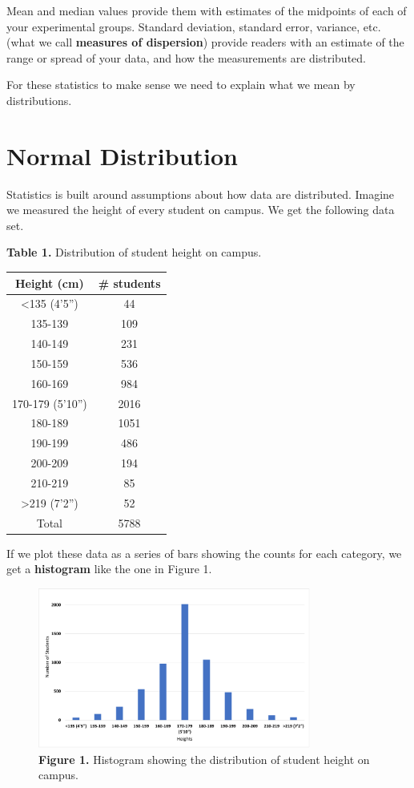 \documentclass[
]{book}
\begin{document}
Mean and median values provide them with estimates of the midpoints of each of your experimental groups. Standard deviation, standard error, variance, etc. (what we call \textbf{measures of dispersion}) provide readers with an estimate of the range or spread of your data, and how the measurements are distributed.

For these statistics to make sense we need to explain what we mean by distributions.

\hypertarget{normal-distribution}{%
\section{Normal Distribution}\label{normal-distribution}}

Statistics is built around assumptions about how data are distributed. Imagine we measured the height of every student on campus. We get the following data set.

\textbf{Table 1.} Distribution of student height on campus.

\begin{longtable}[]{@{}cc@{}}
\toprule
Height (cm) & \# students \\
\midrule
\endhead
\textless135 (4'5'') & 44 \\
135-139 & 109 \\
140-149 & 231 \\
150-159 & 536 \\
160-169 & 984 \\
170-179 (5'10'') & 2016 \\
180-189 & 1051 \\
190-199 & 486 \\
200-209 & 194 \\
210-219 & 85 \\
\textgreater219 (7'2'') & 52 \\
Total & 5788 \\
\bottomrule
\end{longtable}

If we plot these data as a series of bars showing the counts for each category, we get a \textbf{histogram} like the one in Figure 1.

\begin{figure}
\centering
\includegraphics[width=0.8\textwidth,height=\textheight]{images/Histogram1.png}
\caption{\textbf{Figure 1.} Histogram showing the distribution of student height on campus.}
\end{figure}
\end{document}
